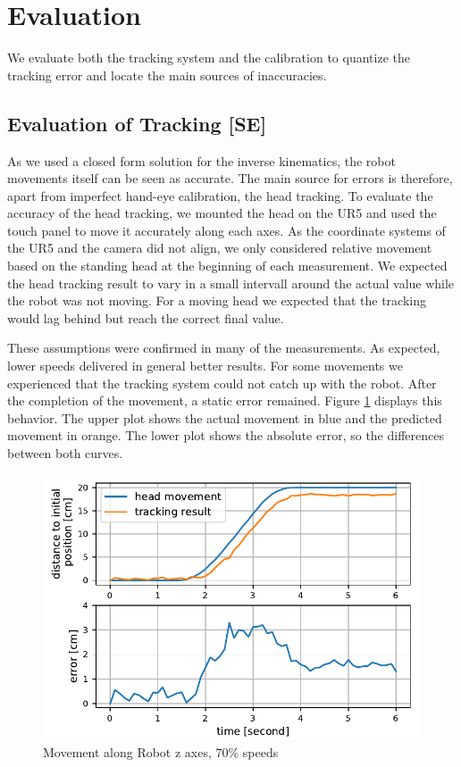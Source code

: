 \section{Evaluation}

We evaluate both the tracking system and the calibration to quantize the tracking error and locate the main sources of inaccuracies.

\subsection{Evaluation of Tracking [SE]}

As we used a closed form solution for the inverse kinematics, the robot movements itself can be seen as accurate. 
The main source for errors is therefore, apart from imperfect hand-eye calibration, the head tracking. To evaluate the accuracy of the head tracking, we mounted the head on the UR5 and used the touch panel to move it accurately along each axes. 
As the coordinate systems of the UR5 and the camera did not align, we only considered relative movement based on the standing head at the beginning of each measurement. We expected the head tracking result to vary in a small intervall around the actual value while the robot was not moving. For a moving head we expected that the tracking would lag behind but reach the correct final value. 

These assumptions were confirmed in many of the measurements. As expected, lower speeds  delivered in general better results. For some movements we experienced that the tracking system could not catch up with the robot. After the completion of the movement, a static error remained. Figure \ref{fig:z70} displays this behavior. The upper plot shows the actual movement in blue and the predicted movement in orange. The lower plot shows the absolute error, so the differences between both curves. 

\begin{figure}[ht]
    \centering
    \includegraphics[width=\linewidth]{tracking_eval_z70}
    \caption{Movement along Robot z axes, 70\% speeds}
    \label{fig:z70}
\end{figure}


